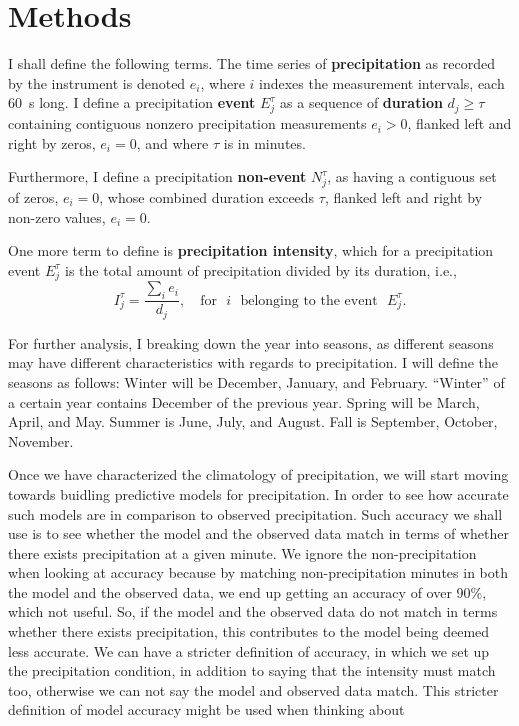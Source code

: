 \documentclass[11pt]{report}
\newcommand{\fracd}[2]{\frac{\displaystyle{#1}}{\displaystyle{#2}}}
\begin{document}
\section{Methods \label{sec:methods}}

I shall define the following terms. The time series of
\textbf{precipitation} as recorded by the instrument is denoted $e_i$,
where $i$ indexes the measurement intervals, each 60~s long. I define
a precipitation \textbf{event} $E_j^\tau $ as a sequence of
\textbf{duration} $d_j\ge \tau$ containing contiguous nonzero
precipitation measurements $e_i>0$, flanked left and right by zeros,
$e_i=0$, and where $\tau$ is in minutes.

Furthermore, I define a precipitation \textbf{non-event} $N_j^\tau$,
  as having a contiguous set of zeros, $e_i=0$, whose combined duration
  exceeds $\tau$, flanked left and right by non-zero values, $e_i=0$.

One more term to define is \textbf{precipitation intensity}, which for
a precipitation event $E_j^\tau$ is the total amount of precipitation
divided by its duration, i.e., 
\begin{equation}
I_j^\tau = \fracd{\sum_i e_i }{d_j} ,
\quad
\mbox{for}\,\,\,\, i\,\,\,\, \mbox{belonging to the event}\,\,\,\, E_j^\tau
.
\end{equation}



For further analysis, I breaking down the year into seasons, as
different seasons may have different characteristics with regards to
precipitation. I will define the seasons as follows: Winter will be
December, January, and February. ``Winter'' of a certain year contains
December of the previous year.  Spring will be March, April, and
May. Summer is June, July, and August. Fall is September, October,
November.

Once we have characterized the climatology of precipitation, we will start moving towards buidling predictive models for precipitation. In order to see how accurate such models are in comparison to observed precipitation. Such accuracy we shall use is to see whether the model and the observed data match in terms of whether there exists precipitation at a given minute. We ignore the non-precipitation when looking at accuracy because by matching non-precipitation minutes in both the model and the observed data, we end up getting an accuracy of over 90\%, which not useful. So, if the model and the observed data do not match in terms whether there exists precipitation, this contributes to the model being deemed less accurate. We can have a stricter definition of accuracy, in which we set up the precipitation condition, in addition to saying that the intensity must match too, otherwise we can not say the model and observed data match. This stricter definition of model accuracy might be used when thinking about 
\end{document}
